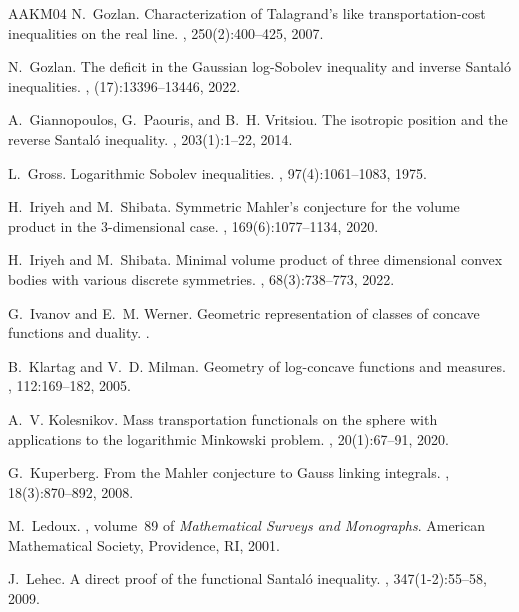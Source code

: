 \documentclass[10pt]{amsart}
\theoremstyle{definition}
\theoremstyle{remark}
\begin{document}
\begin{thebibliography}{AAKM04}
N.~Gozlan.
\newblock Characterization of {Talagrand}'s like transportation-cost
  inequalities on the real line.
, 250(2):400--425, 2007.

N.~Gozlan.
\newblock The deficit in the {G}aussian log-{S}obolev inequality and inverse
  {S}antal\'{o} inequalities.
, (17):13396--13446, 2022.

A.~Giannopoulos, G.~Paouris, and B.~H. Vritsiou.
\newblock The isotropic position and the reverse {S}antal\'{o} inequality.
, 203(1):1--22, 2014.

L.~Gross.
\newblock Logarithmic {S}obolev inequalities.
, 97(4):1061--1083, 1975.

H.~Iriyeh and M.~Shibata.
\newblock Symmetric {M}ahler's conjecture for the volume product in the
  {$3$}-dimensional case.
, 169(6):1077--1134, 2020.

H.~Iriyeh and M.~Shibata.
\newblock Minimal volume product of three dimensional convex bodies with
  various discrete symmetries.
, 68(3):738--773, 2022.

G.~Ivanov and E.~M. Werner.
\newblock Geometric representation of classes of concave functions and duality.
.

B.~Klartag and V.~D. Milman.
\newblock Geometry of log-concave functions and measures.
, 112:169--182, 2005.

A.~V. Kolesnikov.
\newblock Mass transportation functionals on the sphere with applications to
  the logarithmic {Minkowski} problem.
, 20(1):67--91, 2020.

G.~Kuperberg.
\newblock From the {M}ahler conjecture to {G}auss linking integrals.
, 18(3):870--892, 2008.

M.~Ledoux.
, volume~89 of {\em
  Mathematical Surveys and Monographs}.
\newblock American Mathematical Society, Providence, RI, 2001.

J.~Lehec.
\newblock A direct proof of the functional {S}antal\'{o} inequality.
, 347(1-2):55--58, 2009.


\end{thebibliography}
\end{document}
